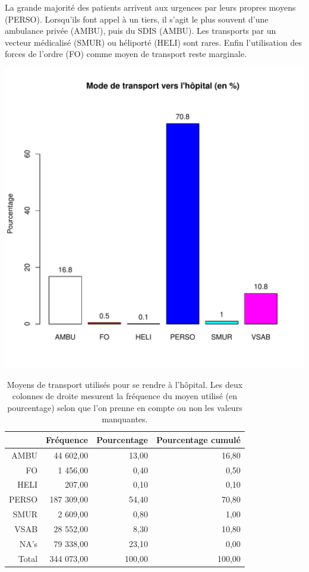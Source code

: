 \documentclass[12pt,english,french,twoside]{book}\usepackage[]{graphicx}\usepackage[]{color}
\makeatletter
\def\maxwidth{ %
  \ifdim\Gin@nat@width>\linewidth
    \linewidth
  \else
    \Gin@nat@width
  \fi
}
\makeatother
\begin{document}
La grande majorité des patients arrivent aux urgences par leurs propres moyens (PERSO). Lorsqu'ils font appel à un tiers, il s'agit le plus souvent d'une ambulance privée (AMBU), puis du SDIS (AMBU). Les transports par un vecteur médicalisé (SMUR) ou héliporté (HELI) sont rares. Enfin l'utilisation des forces de l'ordre (FO) comme moyen de transport reste marginale.


\includegraphics[width=\maxwidth]{figure/transport} 
\begin{table}[ht]
\centering
\begin{tabular}{rrrr}
  \hline
 & Fréquence & Pourcentage & Pourcentage cumulé \\ 
  \hline
AMBU & 44 602,00 & 13,00 & 16,80 \\ 
  FO & 1 456,00 & 0,40 & 0,50 \\ 
  HELI & 207,00 & 0,10 & 0,10 \\ 
  PERSO & 187 309,00 & 54,40 & 70,80 \\ 
  SMUR & 2 609,00 & 0,80 & 1,00 \\ 
  VSAB & 28 552,00 & 8,30 & 10,80 \\ 
  NA's & 79 338,00 & 23,10 & 0,00 \\ 
    Total & 344 073,00 & 100,00 & 100,00 \\ 
   \hline
\end{tabular}
\caption[Moyens de transport]{Moyens de transport utilisés pour se rendre à l'hôpital. Les deux colonnes de droite mesurent la fréquence du moyen utilisé (en pourcentage) selon que l'on prenne en compte ou non les valeurs manquantes. } 
\label{transport}
\end{table}
\end{document}
